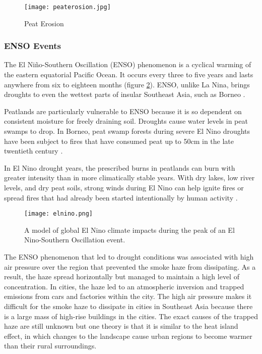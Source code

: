 \begin{figure}
  \texttt{[image: peaterosion.jpg]}
  \caption{Peat Erosion}
  \label{fig:peaterosion}
\end{figure}

\subsubsection{ENSO Events}

The El Ni\~{n}o-Southern Oscillation (ENSO) phenomenon is a cyclical warming of the eastern equatorial Pacific Ocean. It occurs every three to five years and lasts anywhere from six to eighteen months (figure \ref{fig:elnino}). ENSO, unlike La Nina, brings droughts to even the wettest parts of insular Southeast Asia, such as Borneo \citep{aiken2004runaway}.

Peatlands are particularly vulnerable to ENSO because it is so dependent on consistent moisture for freely draining soil. Droughts cause water levels in peat swamps to drop. In Borneo, peat swamp forests during severe El Nino droughts have been subject to fires that have consumed peat up to 50cm in the late twentieth century \citep{turetsky2015global}.

In El Nino drought years, the prescribed burns in peatlands can burn with greater intensity than in more climatically stable years. With dry lakes, low river levels, and dry peat soils, strong winds during El Nino can help ignite fires or spread fires that had already been started intentionally by human activity \citep{chokkalingam2005fire}.  

\begin{figure}
  \texttt{[image: elnino.png]}
  \caption{A model of global El Nino climate impacts during the peak of an El Nino-Southern Oscillation event.}
  \label{fig:elnino}
\end{figure}

The ENSO phenomenon that led to drought conditions was associated with high air pressure over the region that prevented the smoke haze from dissipating. As a result, the haze spread horizontally but managed to maintain a high level of concentration. In cities, the haze led to an atmospheric inversion and trapped emissions from cars and factories within the city. The high air pressure makes it difficult for the smoke haze to dissipate in cities in Southeast Asia because there is a large mass of high-rise buildings in the cities. The exact causes of the trapped haze are still unknown but one theory is that it is similar to the heat island effect, in which changes to the landscape cause urban regions to become warmer than their rural surroundings. 